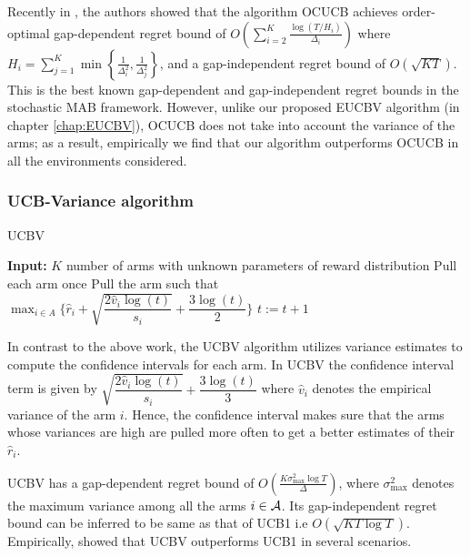     Recently in \citet{lattimore2015optimally}, the authors showed that  the algorithm OCUCB achieves order-optimal gap-dependent regret bound of $O\left(\sum_{i=2}^{K}\frac{\log\left(T/H_i\right)}{\Delta_i}\right)$ where $H_i=\sum_{j=1}^{K}\min\left\lbrace \frac{1}{\Delta_i^2},\frac{1}{\Delta_j^2}\right\rbrace$, and a gap-independent regret bound of $O\left( \sqrt{KT}\right)$. This is the best known gap-dependent and gap-independent regret bounds in the stochastic MAB framework. However, unlike our proposed EUCBV algorithm (in chapter \ref{chap:EUCBV}), OCUCB does not take into account the variance of the arms; as a result, empirically  we find  that our algorithm outperforms OCUCB in all the environments considered. 

\subsubsection{UCB-Variance algorithm}

\begin{algorithm}[!th]
\caption{UCBV}
\label{alg:ucbv}
\begin{algorithmic}[1]
\State \textbf{Input:} $K$ number of arms with unknown parameters of reward distribution
\State Pull each arm once
\State Pull the arm such that $\max_{i\in A}\bigg\lbrace\hat{r}_{i} + \sqrt{\dfrac{2\hat{v}_i\log (t)}{s_i}} + \dfrac{3\log (t)}{2}\bigg\rbrace$
\State $t:=t+1 $
 \EndFor
\end{algorithmic}
\end{algorithm}


    In contrast to the above work, the UCBV \citep{audibert2009exploration} algorithm utilizes variance estimates to compute the confidence intervals for each arm. In UCBV the confidence interval term is given by $\sqrt{\dfrac{2\hat{v}_i\log (t)}{s_i}} + \dfrac{3\log (t)}{3}$ where $\hat{v}_i$ denotes the empirical variance of the arm $i$. Hence, the confidence interval makes sure that the arms whose variances are high are pulled more often to get a better estimates of their $\hat{r}_i$.
    
    UCBV has a gap-dependent regret bound of $O\left(\frac{K\sigma_{\max}^{2}\log T}{\Delta}\right)$, where $\sigma_{\max}^{2}$ denotes the maximum variance among all the arms $i\in \mathcal{A}$. Its gap-independent regret bound can be inferred to be same as that of UCB1 i.e $O \left(\sqrt{KT\log T}\right)$. Empirically, \citet{audibert2009exploration} showed that UCBV outperforms UCB1 in several scenarios. 


